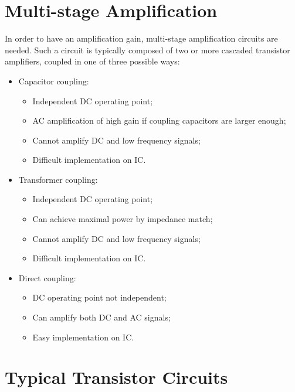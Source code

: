 \documentclass{article}
\begin{document}
\section*{Multi-stage Amplification}

In order to have an amplification gain, multi-stage amplification circuits
are needed. Such a circuit is typically composed of two or more cascaded
transistor amplifiers, coupled in one of three possible ways:
\begin{itemize}
\item Capacitor coupling:
	\begin{itemize}
	\item Independent DC operating point;
	\item AC amplification of high gain if coupling capacitors are
		larger enough;
	\item Cannot amplify DC and low frequency signals;
	\item Difficult implementation on IC.
	\end{itemize}

\item Transformer coupling:
	\begin{itemize}
	\item Independent DC operating point;
	\item Can achieve maximal power by impedance match;
	\item Cannot amplify DC and low frequency signals;
	\item Difficult implementation on IC.
	\end{itemize}

\item Direct coupling:
	\begin{itemize}
	\item DC operating point not independent;
	\item Can amplify both DC and AC signals;
	\item Easy implementation on IC.
	\end{itemize}

\end{itemize}


\section*{Typical Transistor Circuits}
\end{document}
